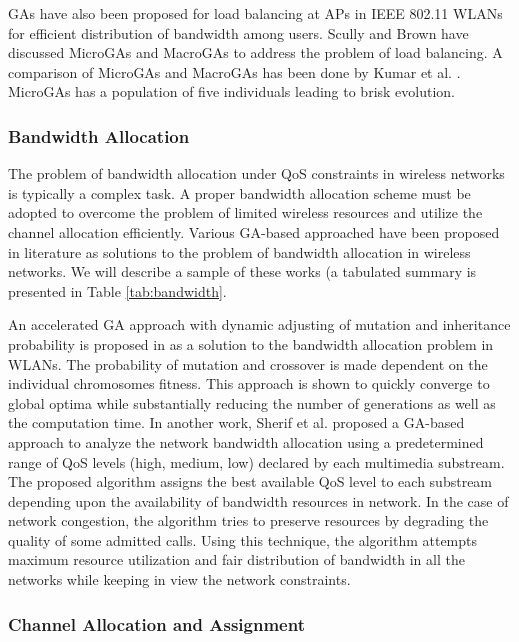 \documentclass[journal]{IEEEtran}
\begin{document}
GAs have also been proposed for load balancing at APs in IEEE 802.11 WLANs for efficient distribution of bandwidth among users. Scully and Brown \cite{scully2009wireless} have discussed MicroGAs and MacroGAs to address the problem of load balancing. A comparison of MicroGAs and MacroGAs has been done by Kumar et al. \cite{krishnakumar1990micro}. MicroGAs has a population of five individuals leading to brisk evolution.

\vspace{2mm}
\subsubsection{Bandwidth Allocation}
\label{sec:BandwidthAllocation}

The problem of bandwidth allocation under QoS constraints in wireless networks is typically a complex task. A proper bandwidth allocation scheme must be adopted to overcome the problem of limited wireless resources and utilize the channel allocation efficiently. Various GA-based approached have been proposed in literature as solutions to the problem of bandwidth allocation in wireless networks. We will describe a sample of these works (a tabulated summary is presented in Table \ref{tab:bandwidth}.

An accelerated GA approach with dynamic adjusting of mutation and inheritance probability is proposed in \cite{lin2012accelerated} as a solution to the bandwidth allocation problem in WLANs. The probability of mutation and crossover is made dependent on the individual chromosomes fitness. This approach is shown to quickly converge to global optima while substantially reducing the number of generations as well as the computation time. In another work, Sherif et al. \cite{sherif2000adaptive} proposed a GA-based approach to analyze the network bandwidth allocation using a predetermined range of QoS levels (high, medium, low) declared by each multimedia substream. The proposed algorithm assigns the best available QoS level to each substream depending upon the availability of bandwidth resources in network. In the case of network congestion, the algorithm tries to preserve resources by degrading the quality of some admitted calls. Using this technique, the algorithm attempts maximum resource utilization and fair distribution of bandwidth in all the networks while keeping in view the network constraints.

\vspace{2mm}
\subsubsection{Channel Allocation and Assignment}
\label{sec:channelAA}
\end{document}
